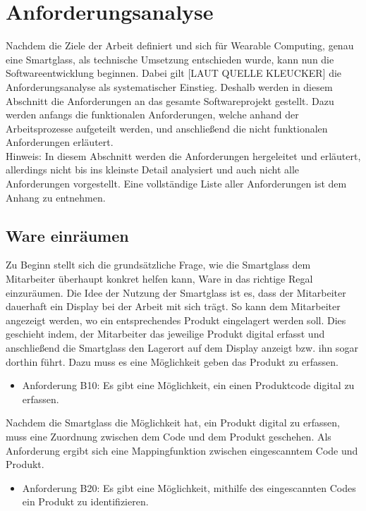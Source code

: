 \chapter{Anforderungsanalyse}
\label{annforderungnsanalyse}
Nachdem die Ziele der Arbeit definiert und sich für Wearable Computing, genau eine Smartglass, als technische Umsetzung entschieden wurde, kann nun die Softwareentwicklung beginnen. Dabei gilt [LAUT QUELLE KLEUCKER] die Anforderungsanalyse als systematischer Einstieg. Deshalb werden in diesem Abschnitt die Anforderungen an das gesamte Softwareprojekt gestellt. Dazu werden anfangs die funktionalen Anforderungen, welche anhand der Arbeitsprozesse aufgeteilt werden, und anschließend die nicht funktionalen Anforderungen erläutert.\\
Hinweis: In diesem Abschnitt werden die Anforderungen hergeleitet und erläutert, allerdings nicht bis ins kleinste Detail analysiert und auch nicht alle Anforderungen vorgestellt. Eine vollständige Liste aller Anforderungen ist dem Anhang zu entnehmen.

\section{Ware einräumen}
Zu Beginn stellt sich die grundsätzliche Frage, wie die Smartglass dem Mitarbeiter überhaupt konkret helfen kann, Ware in das richtige Regal einzuräumen. Die Idee der Nutzung der Smartglass ist es, dass der Mitarbeiter dauerhaft ein Display bei der Arbeit mit sich trägt. So kann dem Mitarbeiter angezeigt werden, wo ein entsprechendes Produkt eingelagert werden soll. Dies geschieht indem, der Mitarbeiter das jeweilige Produkt digital erfasst und anschließend die Smartglass den Lagerort auf dem Display anzeigt bzw. ihn sogar dorthin führt. Dazu muss es eine Möglichkeit geben das Produkt zu erfassen. 

\begin{itemize}
	\item Anforderung B10: Es gibt eine Möglichkeit, ein einen Produktcode digital zu erfassen. \label{anforderung_b10}
\end{itemize}
Nachdem die Smartglass die Möglichkeit hat, ein Produkt digital zu erfassen, muss eine Zuordnung zwischen dem Code und dem Produkt geschehen. Als Anforderung ergibt sich eine Mappingfunktion zwischen eingescanntem Code und Produkt. 

\begin{itemize}
	\item Anforderung B20: Es gibt eine Möglichkeit, mithilfe des eingescannten Codes ein Produkt zu identifizieren. \label{anforderung_b20}
\end{itemize}

